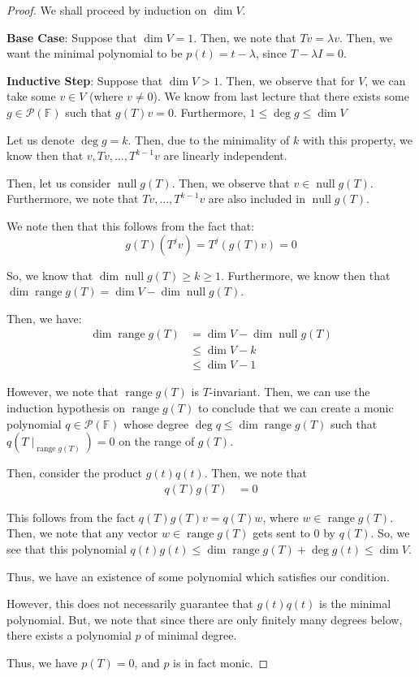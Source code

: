 \documentclass[openany]{book}
\DeclareMathOperator*{\vnull}{null}
\DeclareMathOperator*{\vrange}{range}
\begin{document}
\begin{proof}
	We shall proceed by induction on $\dim V$.
	
	\textbf{Base Case}: Suppose that $\dim V = 1$. Then, we note that $Tv = \lambda v$. Then, we want the minimal polynomial to be $p(t) = t - \lambda$, since $T - \lambda I = 0$.
	
	\textbf{Inductive Step}: Suppose that $\dim V > 1$. Then, we observe that for $V$, we can take some $v \in V$ (where $v \neq 0$). We know from last lecture that there exists some $g \in \mathscr{P}(\mathbb{F})$ such that $g(T)v = 0$. Furthermore, $1 \leq \deg g \leq \dim V$
	
	Let us denote $\deg g = k$. Then, due to the minimality of $k$ with this property, we know then that $v, Tv, \ldots, T^{k-1}v$ are linearly independent.
	
	Then, let us consider $\vnull g(T)$. Then, we observe that $v \in \vnull g(T)$. Furthermore, we note that $Tv, \ldots, T^{k-1}v$ are also included in $\vnull g(T)$.
	
	We note then that this follows from the fact that:
	\begin{equation*}
		g(T)(T^{j}v) = T^{j}(g(T)v) = 0
	\end{equation*}

	So, we know that $\dim \vnull g(T) \geq k \geq 1$. Furthermore, we know then that $\dim \vrange g(T) = \dim V - \dim\vnull g(T)$.
	
	Then, we have:
	\begin{align*}
		\dim \vrange g(T) &= \dim V - \dim\vnull g(T) \\
		&\leq \dim V - k \\
		&\leq \dim V - 1
	\end{align*}

	However, we note that $\vrange g(T)$ is $T$-invariant. Then, we can use the induction hypothesis on $\vrange g(T)$ to conclude that we can create a monic polynomial $q \in\mathscr{P}(\mathbb{F})$ whose degree $\deg q \leq \dim \vrange g(T)$ such that $q(T \mid_{\vrange g(T)}) = 0$ on the range of $g(T)$.
	
	Then, consider the product $g(t)q(t)$. Then, we note that
	\begin{align*}
		q(T)g(T) &= 0
	\end{align*}

	This follows from the fact $q(T)g(T)v = q(T)w$, where $w \in \vrange g(T)$. Then, we note that any vector $w \in \vrange g(T)$ gets sent to $0$ by $q(T)$. So, we see that this polynomial $q(t)g(t) \leq \dim \vrange g(T) + \deg g(t) \leq \dim V$.
	
	Thus, we have an existence of some polynomial which satisfies our condition. 
	
	However, this does not necessarily guarantee that $g(t)q(t)$ is the minimal polynomial. But, we note that since there are only finitely many degrees below, there exists a polynomial $p$ of minimal degree.
	
	Thus, we have $p(T) = 0$, and $p$ is in fact monic.
\end{proof}
\end{document}
